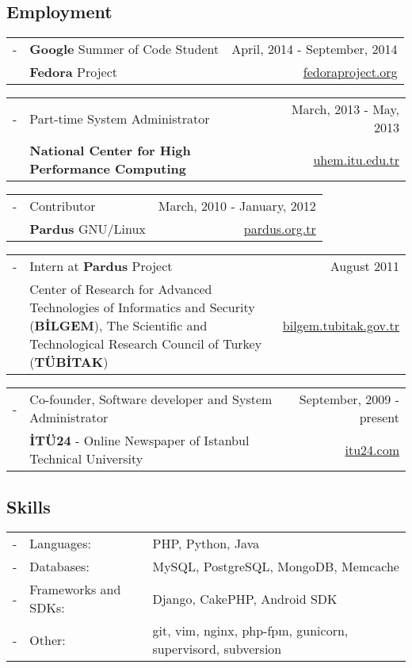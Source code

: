 \documentclass[11pt,a4paper]{article}
\renewenvironment{itemize}{
  \begin{list}{}{
    \setlength{\leftmargin}{0em}
  }
}{
  \end{list}
}
\begin{document}
\subsection*{Employment}
\begin{itemize}
\item
\begin{tabularx}{\textwidth}{l X r}
- & \textbf{Google} Summer of Code Student & April, 2014 - September, 2014\\
& \textbf{Fedora} Project & \href{http://fedoraproject.org/}{fedoraproject.org}
\end{tabularx}
\item
\begin{tabularx}{\textwidth}{l X r}
- & Part-time System Administrator & March, 2013 - May, 2013\\
& \textbf{National Center for High Performance Computing} & \href{http://www.uhem.itu.edu.tr/}{uhem.itu.edu.tr}
\end{tabularx}
\item
\begin{tabularx}{\textwidth}{l X r}
- & Contributor & March, 2010 - January, 2012\\
& \textbf{Pardus} GNU/Linux & \href{http://www.pardus.org.tr/}{pardus.org.tr}
\end{tabularx}
\item
\begin{tabularx}{\textwidth}{l X r}
- & Intern at \textbf{Pardus} Project & August 2011\\
& Center of Research for Advanced Technologies of Informatics and Security (\textbf{BİLGEM}), The Scientific and Technological Research Council of Turkey (\textbf{TÜBİTAK}) & \href{http://bilgem.tubitak.gov.tr}{bilgem.tubitak.gov.tr}
\end{tabularx}
\item
\begin{tabularx}{\textwidth}{l X r}
- & Co-founder, Software developer and System Administrator & September, 2009 - present\\
& \textbf{İTÜ24} - Online Newspaper of Istanbul Technical University & \href{http://itu24.com}{itu24.com}
\end{tabularx}
\end{itemize}

\subsection*{Skills}
\begin{tabularx}{\textwidth}{l l X}
- & Languages: & PHP, Python, Java\\
- & Databases: & MySQL, PostgreSQL, MongoDB, Memcache\\
- & Frameworks and SDKs: & Django, CakePHP, Android SDK\\
- & Other: & git, vim, nginx, php-fpm, gunicorn, supervisord, subversion
\end{tabularx}
\end{document}
